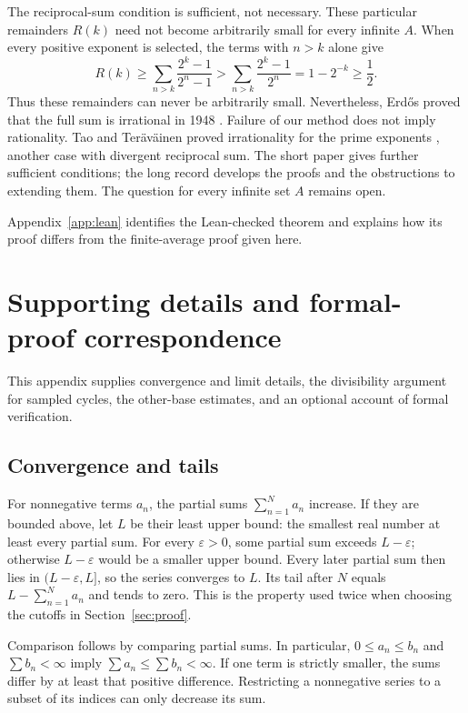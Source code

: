 \documentclass[10pt]{article}
\theoremstyle{plain}
\theoremstyle{definition}
\theoremstyle{remark}
\begin{document}
The reciprocal-sum condition is sufficient, not necessary. These particular
remainders $R(k)$ need not become arbitrarily small for every infinite $A$.
When every positive exponent is selected, the terms with $n>k$ alone give
\[
 R(k)\ge\sum_{n>k}\frac{2^k-1}{2^n-1}
 >\sum_{n>k}\frac{2^k-1}{2^n}
 =1-2^{-k}\ge\frac12.
\]
Thus these remainders can never be arbitrarily small. Nevertheless,
Erd\H{o}s proved that the full sum is irrational in 1948 \cite{erdos1948}.
Failure of our method does not imply rationality.
Tao and Ter\"av\"ainen proved irrationality for the prime exponents
\cite[Theorem~1.3]{taoteravainen2025}, another case with divergent reciprocal
sum. The short paper \cite{shortpaper} gives further sufficient conditions;
the long record \cite{longrecord} develops the proofs and the obstructions
to extending them. The question for every infinite set $A$ remains open.

Appendix~\ref{app:lean} identifies the Lean-checked theorem and explains how
its proof differs from the finite-average proof given here.

\appendix

\section{Supporting details and formal-proof correspondence}\label{app:full}

This appendix supplies convergence and limit details, the divisibility
argument for sampled cycles, the other-base estimates, and an optional
account of formal verification.

\subsection{Convergence and tails}\label{app:sums}

For nonnegative terms $a_n$, the partial sums
$\sum_{n=1}^{N}a_n$ increase. If they are bounded above, let $L$ be their
least upper bound: the smallest real number at least every partial sum.
For every $\varepsilon>0$, some partial sum exceeds $L-\varepsilon$;
otherwise $L-\varepsilon$ would be a smaller upper bound. Every later
partial sum then lies in $(L-\varepsilon,L]$, so the series converges to $L$. Its tail after $N$ equals
$L-\sum_{n=1}^{N}a_n$ and tends to zero. This is the property used twice
when choosing the cutoffs in Section~\ref{sec:proof}.

Comparison follows by comparing partial sums. In particular,
$0\le a_n\le b_n$ and $\sum b_n<\infty$ imply
$\sum a_n\le\sum b_n<\infty$. If one term is strictly smaller, the sums
differ by at least that positive difference. Restricting a nonnegative
series to a subset of its indices can only decrease its sum.
\end{document}
